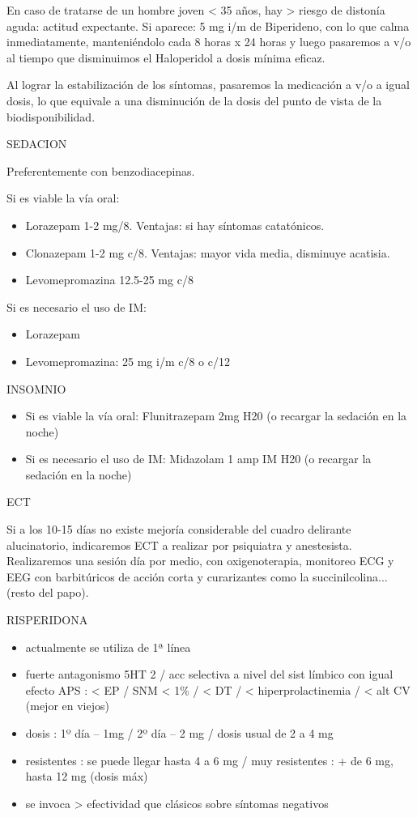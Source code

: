 En caso de tratarse de un hombre joven < 35 años, hay > riesgo de distonía aguda: actitud expectante. Si aparece: 5 mg i/m de Biperideno, con lo que calma inmediatamente, manteniéndolo cada 8 horas x 24 horas y luego pasaremos a v/o al tiempo que disminuimos el Haloperidol a dosis mínima eficaz.

Al lograr la estabilización de los síntomas, pasaremos la medicación a v/o a igual dosis, lo que equivale a una disminución de la dosis del punto de vista de la biodisponibilidad.


SEDACION

Preferentemente con benzodiacepinas.

Si es viable la vía oral:
\begin{itemize}
 \item Lorazepam 1-2 mg/8. Ventajas: si hay síntomas catatónicos.
 \item Clonazepam 1-2 mg c/8. Ventajas: mayor vida media, disminuye acatisia.
 \item Levomepromazina 12.5-25 mg c/8
\end{itemize}

Si es necesario el uso de IM:
\begin{itemize}
 \item Lorazepam
 \item Levomepromazina: 25 mg i/m c/8 o c/12
\end{itemize}

INSOMNIO
\begin{itemize}
 \item Si es viable la vía oral: Flunitrazepam 2mg H20 (o recargar la sedación en la noche)
 \item Si es necesario el uso de IM: Midazolam 1 amp IM H20 (o recargar la sedación en la noche)
\end{itemize}


ECT

Si a los 10-15 días no existe mejoría considerable del cuadro delirante alucinatorio, indicaremos ECT a realizar por psiquiatra y anestesista. Realizaremos una sesión día por medio, con oxigenoterapia, monitoreo ECG y EEG con barbitúricos de acción corta y curarizantes como la succinilcolina... (resto del papo).

\faPills RISPERIDONA
\begin{itemize}
    \item actualmente se utiliza de 1ª línea
    \item fuerte antagonismo 5HT 2 / acc selectiva a nivel del sist límbico con igual efecto APS : < EP / SNM < 1\% / < DT / < hiperprolactinemia / < alt CV (mejor en viejos)
    \item dosis : 1º día – 1mg / 2º día – 2 mg / dosis usual de 2 a 4 mg
    \item resistentes : se puede llegar hasta 4 a 6 mg / muy resistentes : + de 6 mg, hasta 12 mg (dosis máx)
    \item se invoca > efectividad que clásicos sobre síntomas negativos
\end{itemize}

